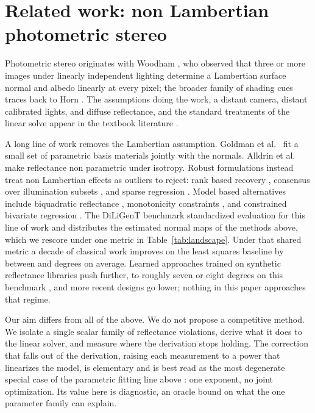 \documentclass[10pt,twocolumn,letterpaper]{article}
\begin{document}
\section{Related work: non Lambertian photometric stereo}

Photometric stereo originates with Woodham \cite{woodham1980}, who observed
that three or more images under linearly independent lighting determine a
Lambertian surface normal and albedo linearly at every pixel; the broader
family of shading cues traces back to Horn \cite{horn1986}. The assumptions
doing the work, a distant camera, distant calibrated lights, and diffuse
reflectance, and the standard treatments of the linear solve appear in the
textbook literature \cite{szeliski2022}.

A long line of work removes the Lambertian assumption. Goldman et
al.~\cite{goldman2005} fit a small set of parametric basis materials jointly
with the normals. Alldrin et al.~\cite{alldrin2008} make reflectance non
parametric under isotropy. Robust formulations instead treat non Lambertian
effects as outliers to reject: rank based recovery \cite{wu2010}, consensus
over illumination subsets \cite{higo2010}, and sparse regression
\cite{ikehata2012}. Model based alternatives include biquadratic reflectance
\cite{shi2012biquadratic}, monotonicity constraints \cite{shi2012elevation},
and constrained bivariate regression \cite{ikehata2014}. The DiLiGenT
benchmark \cite{shi2016} standardized evaluation for this line of work and
distributes the estimated normal maps of the methods above, which we rescore
under one metric in Table~\ref{tab:landscape}. Under that shared metric a
decade of classical work improves on the least squares baseline by between
\landscapeWorstGain{} and \landscapeBestGain{} degrees on average. Learned
approaches trained on synthetic reflectance libraries push further, to roughly
seven or eight degrees on this benchmark \cite{ikehata2018, chen2018}, and
more recent designs go lower; nothing in this paper approaches that regime.

Our aim differs from all of the above. We do not propose a competitive method.
We isolate a single scalar family of reflectance violations, derive what it
does to the linear solver, and measure where the derivation stops holding. The
correction that falls out of the derivation, raising each measurement to a
power that linearizes the model, is elementary and is best read as the most
degenerate special case of the parametric fitting line above
\cite{goldman2005, alldrin2008}: one exponent, no joint optimization. Its
value here is diagnostic, an oracle bound on what the one parameter family can
explain.
\end{document}
